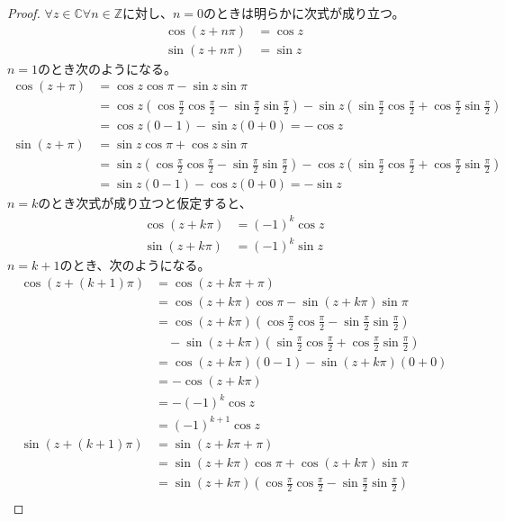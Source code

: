 \documentclass[dvipdfmx]{jsarticle}
\begin{document}
\begin{proof}
$\forall z \in \mathbb{C}\forall n \in \mathbb{Z}$に対し、$n = 0$のときは明らかに次式が成り立つ。
\begin{align*}
\cos(z + n\pi) &= \cos z\\
\sin(z + n\pi) &= \sin z
\end{align*}
$n = 1$のとき次のようになる。
\begin{align*}
\cos(z + \pi) &= \cos z\cos\pi - \sin z\sin\pi\\
&= \cos z\left( \cos\frac{\pi}{2}\cos\frac{\pi}{2} - \sin\frac{\pi}{2}\sin\frac{\pi}{2} \right) - \sin z\left( \sin\frac{\pi}{2}\cos\frac{\pi}{2} + \cos\frac{\pi}{2}\sin\frac{\pi}{2} \right)\\
&= \cos z(0 - 1) - \sin z(0 + 0) = - \cos z\\
\sin(z + \pi) &= \sin z\cos\pi + \cos z\sin\pi\\
&= \sin z\left( \cos\frac{\pi}{2}\cos\frac{\pi}{2} - \sin\frac{\pi}{2}\sin\frac{\pi}{2} \right) - \cos z\left( \sin\frac{\pi}{2}\cos\frac{\pi}{2} + \cos\frac{\pi}{2}\sin\frac{\pi}{2} \right)\\
&= \sin z(0 - 1) - \cos z(0 + 0) = - \sin z
\end{align*}
$n = k$のとき次式が成り立つと仮定すると、
\begin{align*}
\cos(z + k\pi) &= ( - 1)^{k}\cos z\\
\sin(z + k\pi) &= ( - 1)^{k}\sin z
\end{align*}
$n = k + 1$のとき、次のようになる。
\begin{align*}
\cos\left( z + (k + 1)\pi \right) &= \cos(z + k\pi + \pi)\\
&= \cos(z + k\pi)\cos\pi - \sin(z + k\pi)\sin\pi\\
&= \cos(z + k\pi)\left( \cos\frac{\pi}{2}\cos\frac{\pi}{2} - \sin\frac{\pi}{2}\sin\frac{\pi}{2} \right) \\
&\quad - \sin(z + k\pi)\left( \sin\frac{\pi}{2}\cos\frac{\pi}{2} + \cos\frac{\pi}{2}\sin\frac{\pi}{2} \right)\\
&= \cos(z + k\pi)(0 - 1) - \sin(z + k\pi)(0 + 0)\\
&= - \cos(z + k\pi)\\
&= - ( - 1)^{k}\cos z\\
&= ( - 1)^{k + 1}\cos z\\
\sin\left( z + (k + 1)\pi \right) &= \sin(z + k\pi + \pi)\\
&= \sin(z + k\pi)\cos\pi + \cos(z + k\pi)\sin\pi\\
&= \sin(z + k\pi)\left( \cos\frac{\pi}{2}\cos\frac{\pi}{2} - \sin\frac{\pi}{2}\sin\frac{\pi}{2} \right) \\

\end{align*}
\end{proof}
\end{document}
